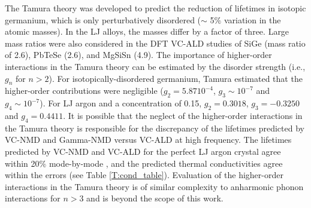\documentclass[aps,prb,onecolumn,preprint,footinbib,superscriptaddress,amsmath,amssymb,floatfix]{revtex4}
\begin{document}
The Tamura theory was developed to predict the reduction of lifetimes 
in isotopic germanium, which is only perturbatively disordered 
($\sim$ 5$\%$ variation in the atomic masses). In the LJ alloys, the 
masses differ by a factor of three. Large mass ratios were also 
considered in the DFT VC-ALD studies of SiGe  
(mass ratio of 2.6)\cite{garg_role_2011}, 
PbTeSe (2.6)\cite{tian_phonon_2012}, 
and MgSiSn (4.9)\cite{li_thermal_2012}. 
The importance of higher-order interactions in 
the Tamura theory can be estimated by the disorder strength 
(i.e., $g_n$ for $n > 2$).\cite{tamura_isotope_1983} 
For isotopically-disordered germanium, Tamura estimated that the 
higher-order contributions were negligible ($g_2 = 5.87 10^{-4}$, 
$g_3 \sim 10^{-7}$ and $g_4 \sim 10^{-7}$).\cite{tamura_isotope_1983} 
For LJ argon and a concentration of 0.15,  
$g_2 = 0.3018$, $g_3 = -0.3250$ and $g_4 = 0.4411$. 
It is possible that the neglect of the higher-order interactions 
in the Tamura theory is responsible for the 
discrepancy of the lifetimes predicted by VC-NMD and Gamma-NMD 
versus VC-ALD at high frequency. The lifetimes predicted by 
VC-NMD and VC-ALD for the perfect LJ argon crystal agree 
within 20$\%$ mode-by-mode , and the 
predicted thermal conductivities agree within the errors (see 
Table \ref{T:cond_table}).  Evaluation of the 
higher-order interactions in the Tamura theory is of similar 
complexity to anharmonic phonon interactions for $n>3$ 
and is beyond the scope of this work.\cite{ecsedy_thermal_1977,
turney_predicting_2009-1} 

\end{document}
